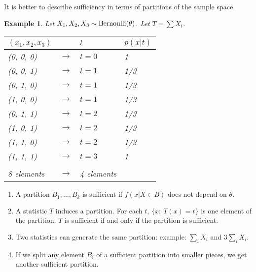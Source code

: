 \documentclass[twoside,12pt]{article}
\newtheorem{example}[theorem]{Example}
\begin{document}
It is better to describe sufficiency in terms of partitions of the sample space.


\begin{example}
Let $X_1, X_2, X_3\sim {\rm Bernoulli} (\theta)$.
Let $T=\sum X_i$.
\begin{center}
\begin{tabular}{llll}
$(x_1,x_2,x_3)$ & & $t$ & $p(x|t)$\\ \hline
(0, 0, 0) & $\rightarrow$ & $t=0$ & 1\\ \hline
(0, 0, 1) & $\rightarrow$ & $t=1$ & 1/3\\
(0, 1, 0) & $\rightarrow$ & $t=1$ & 1/3\\
(1, 0, 0) &  $\rightarrow$ & $t=1$& 1/3 \\  \hline
(0, 1, 1) & $\rightarrow$ & $t=2$ & 1/3\\
(1, 0, 1) &  $\rightarrow$ & $t=2$& 1/3\\
(1, 1, 0) &  $\rightarrow$ & $t=2$& 1/3\\  \hline
(1, 1, 1) &  $\rightarrow$ & $t=3$& 1\\ \\ \hline
8 elements & $\rightarrow$ & 4 elements
\end{tabular}
\end{center}
\end{example}


\begin{enumerate}
\item A partition
$B_1,\ldots, B_k$ is sufficient if
$f(x|X\in B)$ does not depend on $\theta$.
\item A statistic $T$ induces a partition.
For each $t$, $\{x:\ T(x)=t\}$ is one element of the partition.
$T$ is sufficient if and only if
the partition is sufficient.
\item Two statistics can generate the same partition: example:
$\sum_i X_i$ and $3\sum_i X_i$.
\item If we split any element $B_i$ of a sufficient partition into smaller pieces, we get
another sufficient partition.
\end{enumerate}
\end{document}
